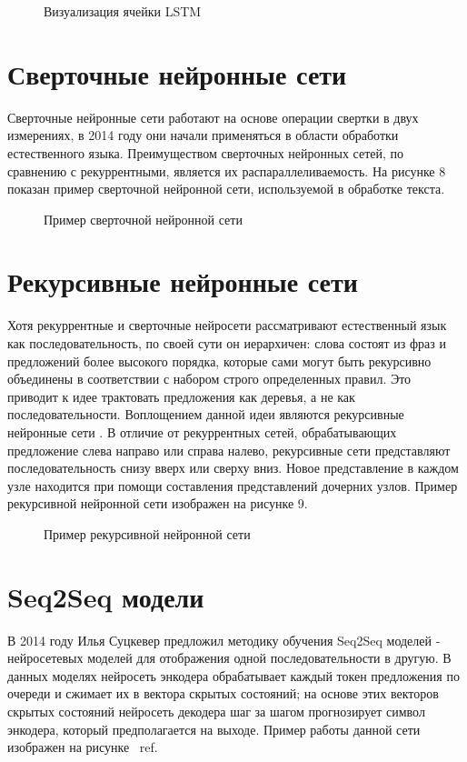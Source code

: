\begin{figure}[ht]
  \caption{Визуализация ячейки LSTM}\label{fig:Neuro3-LSTM}
\end{figure}


\section{Сверточные нейронные сети}
Сверточные нейронные сети работают на основе операции свертки в двух измерениях, в 2014 году \cite{Kalchbrenner_Grefenstette_Blunsom_2014} они начали применяться в области обработки естественного языка. Преимуществом сверточных нейронных сетей, по сравнению с рекуррентными, является их распараллеливаемость. На рисунке 8 показан пример сверточной нейронной сети, используемой в обработке текста.


\begin{figure}[ht]
  \caption{Пример сверточной нейронной сети}\label{fig:Neuro4-CNN}
\end{figure}

\section{Рекурсивные нейронные сети}
Хотя рекуррентные и сверточные нейросети рассматривают естественный язык как последовательность, по своей сути он иерархичен: слова состоят из фраз и предложений более высокого порядка, которые сами могут быть рекурсивно объединены в соответствии с набором строго определенных правил. Это приводит к идее трактовать предложения как деревья, а не как последовательности. Воплощением данной идеи являются рекурсивные нейронные сети \cite{Socher_Perelygin_Wu_Chuang_Manning_Ng_Potts_2013}. В отличие от рекуррентных сетей, обрабатывающих предложение слева направо или справа налево, рекурсивные сети представляют последовательность снизу вверх или сверху вниз. Новое представление в каждом узле находится при помощи составления представлений дочерних узлов. Пример рекурсивной нейронной сети изображен на рисунке 9.



\begin{figure}[ht]
  \caption{Пример рекурсивной нейронной сети}\label{fig:Neuro5-RNN}
\end{figure}

\section{Seq2Seq  модели}
     В 2014 году Илья Суцкевер предложил методику обучения Seq2Seq моделей \cite{Sutskever_Vinyals_Le_2014} - нейросетевых моделей для отображения одной последовательности в другую. В данных моделях нейросеть энкодера обрабатывает каждый токен предложения по очереди  и сжимает их в вектора скрытых состояний; на основе этих векторов скрытых состояний нейросеть декодера шаг за шагом прогнозирует символ энкодера, который предполагается на выходе. Пример работы данной сети изображен на рисунке ~ref.

